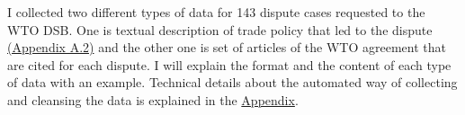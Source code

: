 I collected two different types of data for 143 dispute cases 
requested to the WTO DSB.
One is textual description of trade policy 
that led to the dispute \hyperref[sub:factual-aspect-example]{(Appendix A.2)} and the other one is 
set of articles of the WTO agreement that are
cited for each dispute. 
I will explain the format and the content of 
each type of data with an example. 
Technical details about the automated way 
of collecting and cleansing the data is 
explained in the \hyperref[sec:appendix]{Appendix}.










  
    
  